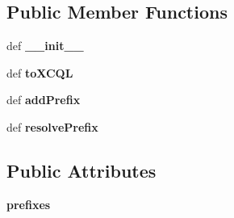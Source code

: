 \subsection*{Public Member Functions}
\begin{DoxyCompactItemize}
\item 
\hypertarget{classcheshire3_1_1cql_parser_1_1_prefixable_object_abe46b0ba27fe2e819442c86947df401f}{def {\bfseries \-\_\-\-\_\-init\-\_\-\-\_\-}}\label{classcheshire3_1_1cql_parser_1_1_prefixable_object_abe46b0ba27fe2e819442c86947df401f}

\item 
\hypertarget{classcheshire3_1_1cql_parser_1_1_prefixable_object_a7f8a3c99a1088174372b94ebd47e07af}{def {\bfseries to\-X\-C\-Q\-L}}\label{classcheshire3_1_1cql_parser_1_1_prefixable_object_a7f8a3c99a1088174372b94ebd47e07af}

\item 
\hypertarget{classcheshire3_1_1cql_parser_1_1_prefixable_object_aac7c6a86cd5687e5bc14db0398d98ddc}{def {\bfseries add\-Prefix}}\label{classcheshire3_1_1cql_parser_1_1_prefixable_object_aac7c6a86cd5687e5bc14db0398d98ddc}

\item 
\hypertarget{classcheshire3_1_1cql_parser_1_1_prefixable_object_af996f9afef00c9bfef1e551b4231e573}{def {\bfseries resolve\-Prefix}}\label{classcheshire3_1_1cql_parser_1_1_prefixable_object_af996f9afef00c9bfef1e551b4231e573}

\end{DoxyCompactItemize}
\subsection*{Public Attributes}
\begin{DoxyCompactItemize}
\item 
\hypertarget{classcheshire3_1_1cql_parser_1_1_prefixable_object_a429ed4bc9aad4aabf6f365ac8c64a0b8}{{\bfseries prefixes}}\label{classcheshire3_1_1cql_parser_1_1_prefixable_object_a429ed4bc9aad4aabf6f365ac8c64a0b8}

\end{DoxyCompactItemize}
